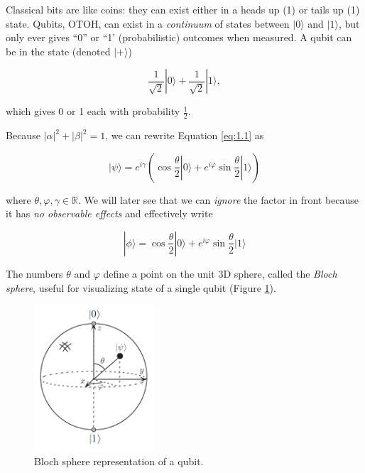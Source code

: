 \documentclass{article}
\numberwithin{equation}{section}
\newcommand{\bracket}[1]{|#1\rangle}
\begin{document}
Classical bits are like coins: they can exist either in a heads up (1) or tails up (1) state. Qubits, OTOH, can exist in a \textit{continuum} of states between $\bracket{0}$ and $\bracket{1}$, but only ever gives ``0'' or ``1' (probabilistic) outcomes when measured. A qubit can be in the state (denoted $\bracket{+}$)

\begin{equation} \label{eq:1.2}
\frac{1}{\sqrt{2}} \bracket{0} + \frac{1}{\sqrt{2}} \bracket{1},
\end{equation}

which gives 0 or 1 each with probability $\frac{1}{2}$.

Because $|\alpha|^2 + |\beta|^2 = 1$, we can rewrite Equation \ref{eq:1.1} as

\begin{equation} \label{eq:1.3}
\bracket{\psi} = e^{i \gamma} \left(\cos \frac{\theta}{2} \bracket{0} + e^{i \varphi} \sin \frac{\theta}{2} \bracket{1} \right)
\end{equation}

where $\theta, \varphi, \gamma \in \mathbb{R}$. We will later see that we can \textit{ignore} the factor in front because it has \textit{no observable effects} and effectively write

\begin{equation} \label{eq:1.4}
\bracket{\phi} = \cos \frac{\theta}{2} \bracket{0} + e^{i \varphi} \sin \frac{\theta}{2} \bracket{1}
\end{equation}

The numbers $\theta$ and $\varphi$ define a point on the unit 3D sphere, called the \textit{Bloch sphere}, useful for visualizing state of a single qubit (Figure \ref{fig:1.1}).

\begin{figure} \label{fig:1.1}
	\centering
	\includegraphics[width=0.4\textwidth]{bloch_sphere.png}
	\caption{Bloch sphere representation of a qubit.}
\end{figure}
\end{document}
